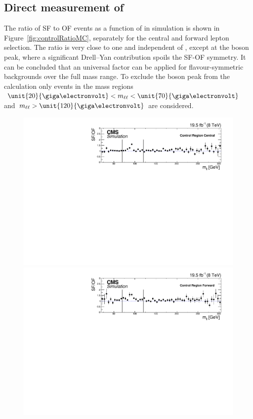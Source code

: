 \subsection{Direct measurement of \Rsfof}
The ratio of SF to OF events as a function of \mll in simulation is shown in Figure~\ref{fig:controlRatioMC}, separately for the central and forward lepton selection. The ratio is very close to one and independent of \mll, except at the \Z boson peak, where a significant Drell--Yan contribution spoils the SF-OF symmetry. It can be concluded that an universal factor can be applied for flavour-symmetric backgrounds over the full mass range. To exclude the \Z boson peak from the calculation only events in the mass regions $\unit{20}{\giga\electronvolt}< \mll < \unit{70}{\giga\electronvolt}$ and $\mll > \unit{120}{\giga\electronvolt}$ are considered.   	
\begin{figure}
\begin{center}
\includegraphics[scale=0.4]{plots/BG/control/rSFOF_ControlCentral_Full2012_Mll_None_MC.pdf}\\
\includegraphics[scale=0.4]{plots/BG/control/rSFOF_ControlForward_Full2012_Mll_None_MC.pdf}

\end{center}
\end{figure}
